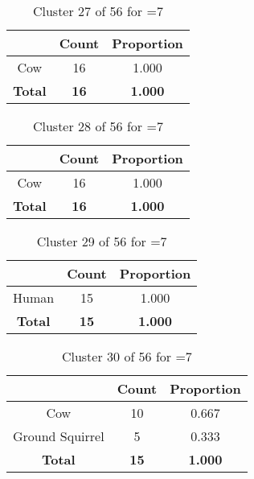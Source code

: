 \begin{table}[ht!]
\centering
\begin{tabular}{|c|c|c|}
\hline
\bf \Spec{} &\bf Count &\bf Proportion\\ \hline \hline
Cow & 16 & 1.000\\ \hline
\hline
\bf Total & \bf 16 & \bf 1.000\\ \hline
\end{tabular}
\label{tab:cluster:27:7}
\caption{Cluster 27 of 56 for \minneigh{}=7}
\end{table}

\begin{table}[ht!]
\centering
\begin{tabular}{|c|c|c|}
\hline
\bf \Spec{} &\bf Count &\bf Proportion\\ \hline \hline
Cow & 16 & 1.000\\ \hline
\hline
\bf Total & \bf 16 & \bf 1.000\\ \hline
\end{tabular}
\label{tab:cluster:28:7}
\caption{Cluster 28 of 56 for \minneigh{}=7}
\end{table}

\begin{table}[ht!]
\centering
\begin{tabular}{|c|c|c|}
\hline
\bf \Spec{} &\bf Count &\bf Proportion\\ \hline \hline
Human & 15 & 1.000\\ \hline
\hline
\bf Total & \bf 15 & \bf 1.000\\ \hline
\end{tabular}
\label{tab:cluster:29:7}
\caption{Cluster 29 of 56 for \minneigh{}=7}
\end{table}

\clearpage
\begin{table}[ht!]
\centering
\begin{tabular}{|c|c|c|}
\hline
\bf \Spec{} &\bf Count &\bf Proportion\\ \hline \hline
Cow & 10 & 0.667\\ \hline
Ground Squirrel & 5 & 0.333\\ \hline
\hline
\bf Total & \bf 15 & \bf 1.000\\ \hline
\end{tabular}
\label{tab:cluster:30:7}
\caption{Cluster 30 of 56 for \minneigh{}=7}
\end{table}

